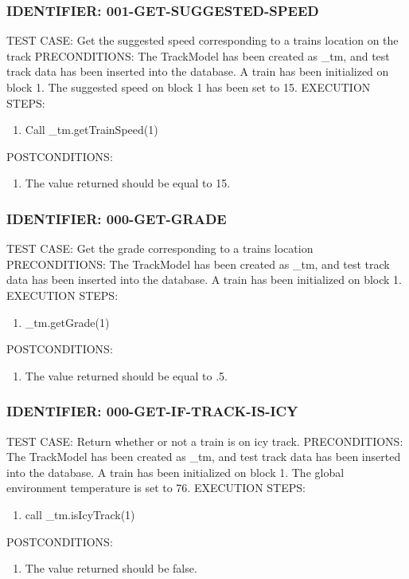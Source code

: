 \documentclass{scrreprt}
\begin{document}
\subsubsection{IDENTIFIER: 001-GET-SUGGESTED-SPEED}
TEST CASE: Get the suggested speed corresponding to a trains location on the track
PRECONDITIONS: The TrackModel has been created as _tm, and test track data has been inserted into the database. A train has been initialized on block 1. The suggested speed on block 1 has been set to 15.
EXECUTION STEPS:
\begin{enumerate}
	\item Call _tm.getTrainSpeed(1)
\end{enumerate}
POSTCONDITIONS:
\begin{enumerate}
	\item The value returned should be equal to 15.
\end{enumerate}

\subsubsection{IDENTIFIER: 000-GET-GRADE}
TEST CASE: Get the grade corresponding to a trains location
PRECONDITIONS: The TrackModel has been created as _tm, and test track data has been inserted into the database. A train has been initialized on block 1.
EXECUTION STEPS:
\begin{enumerate}
	\item _tm.getGrade(1)
\end{enumerate}
POSTCONDITIONS:
\begin{enumerate}
	\item The value returned should be equal to .5.
\end{enumerate}

\subsubsection{IDENTIFIER: 000-GET-IF-TRACK-IS-ICY}
TEST CASE: Return whether or not a train is on icy track.
PRECONDITIONS: The TrackModel has been created as _tm, and test track data has been inserted into the database. A train has been initialized on block 1. The global environment temperature is set to 76.
EXECUTION STEPS:
\begin{enumerate}
	\item call _tm.isIcyTrack(1)
\end{enumerate}
POSTCONDITIONS:
\begin{enumerate}
	\item The value returned should be false.
\end{enumerate}
\end{document}
